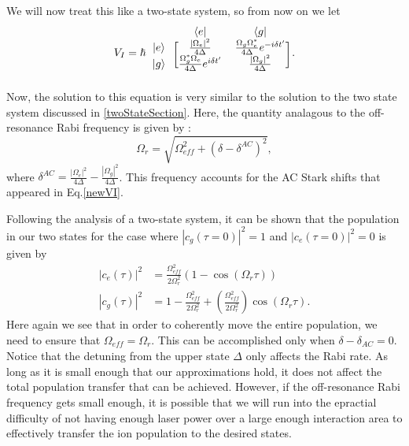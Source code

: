 We will now treat this like a two-state system, so from now on we let 
\begin{equation}
V_I=
\hbar
\begin{blockarray}{ccc}
&\langle e| & \langle g|\\
\begin{block}{c[cc]}
|e\rangle & \frac{|\Omega_e|^2}{4\Delta} & \frac{\Omega_g\Omega_e^*}{4\Delta}e^{-i\delta t'}\\
|g\rangle & \frac{\Omega_g^*\Omega_e}{4\Delta}e^{i\delta t'} & \frac{|\Omega_g|^2}{4\Delta}\\
\end{block}
\end{blockarray}.\label{newVI}
\end{equation}
Now, the solution to this equation is very similar to the solution to the two state system discussed in \ref{twoStateSection}. Here, the quantity analagous to the off-resonance Rabi frequency is given by \cite{Young1997363}: 
\begin{equation}
\Omega_\mathit{r}=\sqrt{\Omega_\mathit{eff}^2+(\delta-\delta^{AC})^2},
\end{equation}
where $\delta^{AC}= \frac{|\Omega_e|^2}{4\Delta}-\frac{|\Omega_g|^2}{4\Delta}$. This frequency accounts for the AC Stark shifts that appeared in Eq.\eqref{newVI}.

Following the analysis of a two-state system, it can be shown that the population in our two states for the case where $|c_g(\tau=0)|^2=1$ and $|c_e(\tau=0)|^2=0$ is given by 
\begin{align}
|c_e(\tau)|^2&
=\frac{\Omega_{\mathit{eff}}^2}{2\Omega_r^2}(1-\cos(\Omega_r\tau))\\
|c_g(\tau)|^2&=
1-\frac{\Omega_{\mathit{eff}}^2}{2\Omega_r^2} + \left(\frac{\Omega_{\mathit{eff}}^2}{2\Omega_r^2}\right)\cos(\Omega_r \tau).
\end{align}
Here again we see that in order to coherently move the entire population, we need to ensure that $\Omega_{\mathit{eff}}=\Omega_r$. This can be accomplished only when $\delta-\delta_{AC}=0$. Notice that the detuning from the upper state $\Delta$ only affects the Rabi rate. As long as it is small enough that our approximations hold, it does not affect the total population transfer that can be achieved. However, if the off-resonance Rabi frequency gets small enough, it is possible that we will run into the epractial difficulty of not having enough laser power over a large enough interaction area to effectively transfer the ion population to the desired states.

